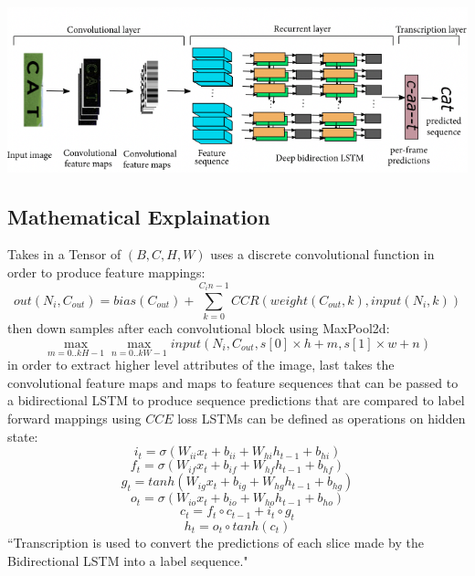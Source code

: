 \documentclass[11pt]{article}
\begin{document}
\includegraphics[scale=0.5]{CRNN.png}

\subsection{Mathematical Explaination}
Takes in a Tensor of $(B,C,H,W)$ uses a discrete convolutional function in order to produce feature mappings:
$$
out(N_i, C_{out}) = bias(C_{out}) + \sum_{k=0}^{C_in-1} CCR(weight(C_{out}, k), input(N_i, k))
$$
then down samples after each convolutional block using MaxPool2d:
$$
\mathop{max}_{m=0..kH-1} \mathop{max}_{n=0..kW-1} input(N_i, C_{out},s[0]\times{}h+m, s[1]\times{}w+n)
$$
in order to extract higher level attributes of the image, last takes the convolutional feature maps and maps to feature sequences that can be passed to a bidirectional LSTM to produce sequence predictions that are compared to label forward mappings using $CCE$ loss \cite{pytorch}
LSTMs can be defined as operations on hidden state:
$$i_t = \sigma(W_{ii}x_t + b_{ii} + W_{hi}h_{t-1} + b_{hi})$$
$$f_t = \sigma(W_{if}x_t + b_{if} + W_{hf}h_{t-1} + b_{hf})$$
$$g_t = tanh(W_{ig}x_t + b_{ig} + W_{hg}h_{t-1} + b_{hg})$$
$$o_t = \sigma(W_{io}x_t + b_{io} + W_{ho}h_{t-1} + b_{ho})$$
$$c_t = f_t \circ{} c_{t-1} + i_t \circ{} g_t$$
$$h_t = o_t \circ{} tanh(c_t)$$
``Transcription is used to convert the predictions of each slice made by the Bidirectional LSTM into a label sequence." \cite{feng2019}
\end{document}
